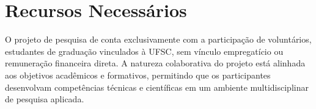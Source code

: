 \chapter{Recursos Necessários}

O projeto de pesquisa de \imprimirsubtitulo{} conta exclusivamente com a participação de voluntários, estudantes de graduação vinculados à \gls{UFSC}, sem vínculo empregatício ou remuneração financeira direta. A natureza colaborativa do projeto está alinhada aos objetivos acadêmicos e formativos, permitindo que os participantes desenvolvam competências técnicas e científicas em um ambiente multidisciplinar de pesquisa aplicada.
